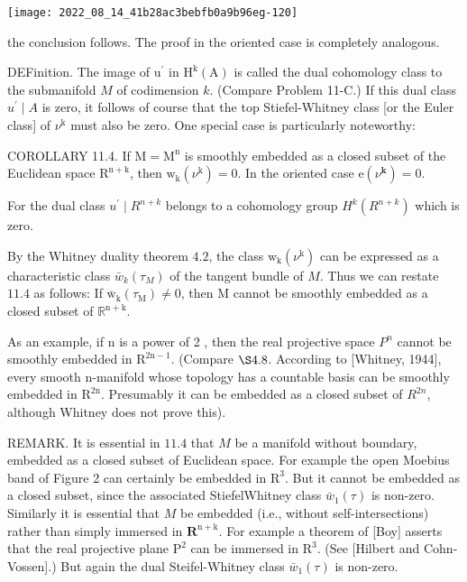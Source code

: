 \documentclass[10pt]{article}
\begin{document}
\texttt{[image: 2022\_08\_14\_41b28ac3bebfb0a9b96eg-120]}

the conclusion follows. The proof in the oriented case is completely analogous.

DEFinition. The image of $\mathrm{u}^{\prime}$ in $\mathrm{H}^{\mathrm{k}}(\mathrm{A})$ is called the dual cohomology class to the submanifold $M$ of codimension $k$. (Compare Problem 11-C.) If this dual class $u^{\prime} \mid A$ is zero, it follows of course that the top Stiefel-Whitney class [or the Euler class] of $\nu^{\mathrm{k}}$ must also be zero. One special case is particularly noteworthy:

COROLLARY 11.4. If $\mathrm{M}=\mathrm{M}^{\mathrm{n}}$ is smoothly embedded as a closed subset of the Euclidean space $\mathrm{R}^{\mathrm{n}+\mathrm{k}}$, then $\mathrm{w}_{\mathrm{k}}\left(\nu^{\mathrm{k}}\right)=0$. In the oriented case $\mathrm{e}\left(\nu^{\mathbf{k}}\right)=0$.

For the dual class $u^{\prime} \mid R^{n+k}$ belongs to a cohomology group $H^{k}\left(R^{n+k}\right)$ which is zero.

By the Whitney duality theorem $4.2$, the class $\mathrm{w}_{\mathrm{k}}\left(\nu^{\mathrm{k}}\right)$ can be expressed as a characteristic class $\bar{w}_{k}\left(\tau_{M}\right)$ of the tangent bundle of $M$. Thus we can restate $11.4$ as follows: If $\overline{\mathrm{w}}_{\mathrm{k}}\left(\tau_{\mathrm{M}}\right) \neq 0$, then $\mathrm{M}$ cannot be smoothly embedded as a closed subset of $\mathbb{R}^{\mathrm{n}+\mathrm{k}}$.

As an example, if $\mathrm{n}$ is a power of 2 , then the real projective space $P^{n}$ cannot be smoothly embedded in $\mathrm{R}^{2 \mathrm{n}-1}$. (Compare $\S 4.8$. According to [Whitney, 1944], every smooth $\mathrm{n}$-manifold whose topology has a countable basis can be smoothly embedded in $\mathrm{R}^{2 \mathrm{n}}$. Presumably it can be embedded as a closed subset of $R^{2 n}$, although Whitney does not prove this).

REMARK. It is essential in $11.4$ that $M$ be a manifold without boundary, embedded as a closed subset of Euclidean space. For example the open Moebius band of Figure 2 can certainly be embedded in $\mathrm{R}^{3}$. But it cannot be embedded as a closed subset, since the associated StiefelWhitney class $\bar{w}_{1}(\tau)$ is non-zero. Similarly it is essential that $M$ be embedded (i.e., without self-intersections) rather than simply immersed in $\mathbf{R}^{\mathrm{n}+\mathrm{k}}$. For example a theorem of [Boy] asserts that the real projective plane $\mathrm{P}^{2}$ can be immersed in $\mathrm{R}^{3}$. (See [Hilbert and Cohn-Vossen].) But again the dual Steifel-Whitney class $\bar{w}_{1}(\tau)$ is non-zero.
\end{document}

